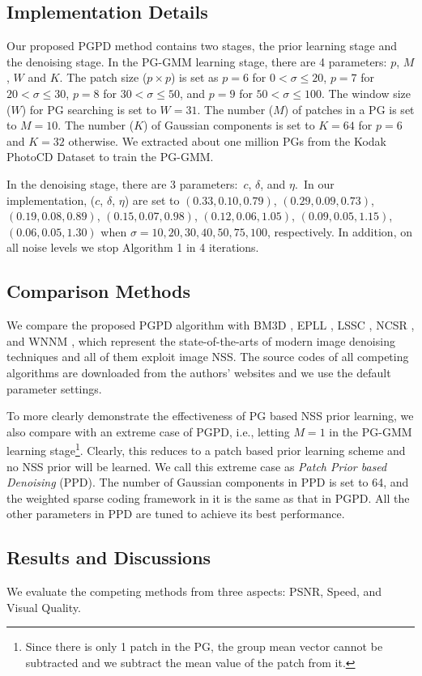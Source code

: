 \subsection{Implementation Details}
Our proposed PGPD method contains two stages, the prior learning stage and the denoising stage. In the PG-GMM learning stage, there are 4 parameters: $p$, $M$, $W$ and $K$. The patch size ($p\times p$) is set as $p = 6$ for $0 < \sigma \le 20$, $p = 7$ for $20 < \sigma \le 30$, $p = 8$ for $30 < \sigma \le 50$, and $p=9$ for $50 < \sigma \le 100$. The window size ($W$) for PG searching is set to $W = 31$. The number ($M$) of patches in a PG is set to $M=10$. The number ($K$) of Gaussian components is set to $K=64$ for $p=6$ and $K=32$ otherwise. We extracted about one million PGs from the Kodak PhotoCD Dataset to train the PG-GMM. 

In the denoising stage, there are 3 parameters:\ $c$, $\delta$, and $\eta$.\ In our implementation, ($c$, $\delta$, $\eta$) are set to $(0.33,0.10,0.79)$, $(0.29,0.09,0.73)$, $(0.19,0.08,0.89)$, $(0.15,0.07,0.98)$, $(0.12,0.06,1.05)$, $(0.09,0.05,1.15)$, $(0.06,0.05,1.30)$ when $\sigma=10,20,30,40,50,75,100$, respectively. In addition, on all noise levels we stop Algorithm 1 in 4 iterations.
\subsection{Comparison Methods}
We compare the proposed PGPD algorithm with BM3D \cite{bm3d}, EPLL \cite{epll}, LSSC \cite{lssc}, NCSR \cite{ncsr}, and WNNM \cite{wnnm}, which represent the state-of-the-arts of modern image denoising techniques and all of them exploit image NSS. The source codes of all competing algorithms are downloaded from the authors' websites and we use the default parameter settings.  

To more clearly demonstrate the effectiveness of PG based NSS prior learning, we also compare with an extreme case of PGPD, i.e., letting $M=1$ in the PG-GMM learning stage\footnote{Since there is only 1 patch in the PG, the group mean vector cannot be subtracted and we subtract the mean value of the patch from it.}. Clearly, this reduces to a patch based prior learning scheme and no NSS prior will be learned. We call this extreme case as \textsl{Patch Prior based Denoising} (PPD).  The number of Gaussian components in PPD is set to 64, and the weighted sparse coding framework in it is the same as that in PGPD. All the other parameters in PPD are tuned to achieve its best performance.
\subsection{Results and Discussions}
We evaluate the competing methods from three aspects: PSNR, Speed, and Visual Quality.

